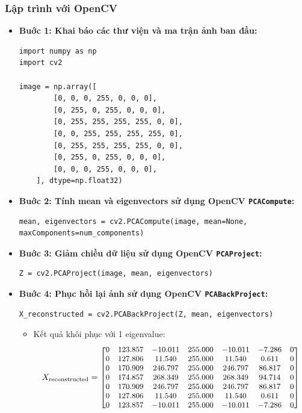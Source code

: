         \subsubsection{Lập trình với OpenCV}
            \begin{itemize}
                \item \textbf{Buớc 1: Khai báo các thư viện và ma trận ảnh ban đầu:}
                \begin{lstlisting}
import numpy as np
import cv2

image = np.array([
        [0, 0, 0, 255, 0, 0, 0],
        [0, 255, 0, 255, 0, 0, 0],
        [0, 255, 255, 255, 255, 0, 0],
        [0, 0, 255, 255, 255, 255, 0],
        [0, 255, 255, 255, 255, 0, 0],
        [0, 255, 0, 255, 0, 0, 0],
        [0, 0, 0, 255, 0, 0, 0],
    ], dtype=np.float32)
                \end{lstlisting}
                \item \textbf{Buớc 2: Tính mean và eigenvectors sử dụng OpenCV \texttt{PCACompute}:}
                \begin{lstlisting}
mean, eigenvectors = cv2.PCACompute(image, mean=None, maxComponents=num_components)
                \end{lstlisting}
                \item \textbf{Buớc 3: Giảm chiều dữ liệu sử dụng OpenCV \texttt{PCAProject}:}
                \begin{lstlisting}
Z = cv2.PCAProject(image, mean, eigenvectors) 
                \end{lstlisting}
                \item \textbf{Buớc 4: Phục hồi lại ảnh sử dụng OpenCV \texttt{PCABackProject}:}
                \begin{lstlisting}
X_reconstructed = cv2.PCABackProject(Z, mean, eigenvectors) 
                \end{lstlisting}
                \begin{itemize}
                    \item Kết quả khôi phục với 1 eigenvalue:
                    \begin{align*}
                        \small
                        X_{\text{reconstructed}} = \begin{bmatrix}
                        0 & 123.857 & -10.011 & 255.000 & -10.011 & -7.286 & 0 \\
                        0 & 127.806 & 11.540 & 255.000 & 11.540 & 0.611 & 0 \\
                        0 & 170.909 & 246.797 & 255.000 & 246.797 & 86.817 & 0 \\
                        0 & 174.857 & 268.349 & 255.000 & 268.349 & 94.714 & 0 \\
                        0 & 170.909 & 246.797 & 255.000 & 246.797 & 86.817 & 0 \\
                        0 & 127.806 & 11.540 & 255.000 & 11.540 & 0.611 & 0 \\
                        0 & 123.857 & -10.011 & 255.000 & -10.011 & -7.286 & 0
                        \end{bmatrix}
                    \end{align*}
                    

\end{itemize}
\end{itemize}
